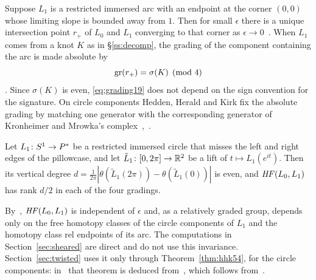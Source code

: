 Suppose $L_1$ is a restricted immersed arc with an endpoint at the corner $(0,0)$ whose limiting slope is bounded
away from $1$. Then for small $\epsilon$ there is a unique intersection point $r_+$ of $L_0$ and $L_1$ converging
to that corner as $\epsilon\to0$~\cite[Lemma~5.1]{HHK2}. When $L_1$ comes from a knot $K$ as in \S\ref{ss:decomp},
the grading of the component containing the arc is made absolute by
\begin{equation}\label{eq:grading19}
\operatorname{gr}(r_+)=\sigma(K)\pmod4
\end{equation}
\cite[(19)]{HHK2}. Since $\sigma(K)$ is even, \eqref{eq:grading19} does not depend on the sign convention for the
signature. On circle components Hedden, Herald and Kirk fix the absolute grading by matching one generator with
the corresponding generator of Kronheimer and Mrowka's complex~\cite[\S6.1]{HHK2},~\cite[Prop.~4.4]{KM2}.

\begin{theorem}\label{thm:hhk54}
Let $L_1\colon S^1\to P^{*}$ be a restricted immersed circle that misses the left and right edges of the
pillowcase, and let $\tilde L_1\colon[0,2\pi]\to\mathbb{R}^2$ be a lift of $t\mapsto L_1(e^{it})$. Then its vertical degree
$d=\frac1{2\pi}|\theta(\tilde L_1(2\pi))-\theta(\tilde L_1(0))|$ is even, and $\mathit{HF}(L_0,L_1)$ has rank $d/2$ in each of
the four gradings.
\end{theorem}

\begin{remark}\label{rem:invariance}
By~\cite[Thm.~4.1, Cor.~4.6]{HHK2}, $\mathit{HF}(L_0,L_1)$ is independent of $\epsilon$ and, as a relatively graded group,
depends only on the free homotopy classes of the circle components of $L_1$ and the homotopy class rel endpoints
of its arc. The computations in Section~\ref{sec:sheared} are direct and do not use this invariance.
Section~\ref{sec:twisted} uses it only through Theorem~\ref{thm:hhk54}, for the circle components: in~\cite{HHK2}
that theorem is deduced from~\cite[Cor.~4.6]{HHK2}, which follows from~\cite[Thm.~4.1]{HHK2}.
\end{remark}

